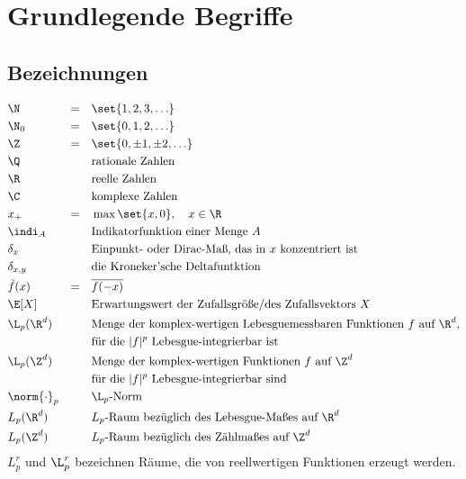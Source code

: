 
\chapter{Grundlegende Begriffe}
\section{Bezeichnungen}

\begin{notationnr}
	\begin{align*}
		&\N &=&&&\set{1,2,3,\ldots}\\
		&\N_0&=&&&\set{0,1,2,\ldots}\\
		&\Z&=&&&\set{0,\pm 1,\pm2,\ldots}\\
		&\Q &&&&\text{rationale Zahlen}\\
		&\R &&&&\text{reelle Zahlen}\\
		&\C &&&&\text{komplexe Zahlen}\\
		&x_+ &=&&&\max\set{x,0},\quad x\in\R\\
		&\indi_A &&&&\text{Indikatorfunktion einer Menge }A\\
		&\delta_x&&&&\text{Einpunkt- oder Dirac-Maß, das in $x$ konzentriert ist}\\
		&\delta_{x,y}&&&&\text{die Kroneker'sche Deltafuntktion}\\
		&\tilde{f}(x)&=&&&\overline{f(-x)}\\
		&\E[X]&&&&\text{Erwartungswert der Zufallsgröße/des Zufallsvektors }X\\
		&\L_p(\R^d)&&&&\text{Menge der komplex-wertigen Lebesguemessbaren Funktionen $f$ auf $\R^d$,}\\
		&&&&&\text{für die $|f|^p$ Lebesgue-integrierbar ist}\\
		&\L_p(\Z^d)&&&&\text{Menge der komplex-wertigen Funktionen $f$ auf $\Z^d$}\\
		&&&&&\text{für die $|f|^p$ Lebesgue-integrierbar sind}\\
		&\norm{\cdot}_p&&&&\L_p\text{-Norm}\\
		&L_p(\R^d)&&&&L_p\text{-Raum bezüglich des Lebesgue-Maßes auf $\R^d$}\\
		&L_p(\Z^d)&&&&L_p\text{-Raum bezüglich des Zählmaßes auf $\Z^d$} 
	\end{align*}
	$L_p^r$ und $\L_p^r$ bezeichnen Räume, die von reellwertigen Funktionen erzeugt werden.
\end{notationnr}

